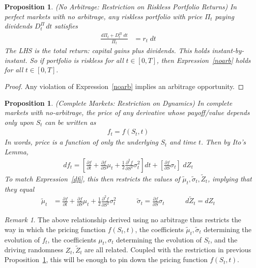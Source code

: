 \documentclass[12pt]{article}
\theoremstyle{plain}
\newtheorem{prop}[thm]{Proposition}
\theoremstyle{definition}
\theoremstyle{remark}
\newtheorem*{rmk}{Remark}
\begin{document}
\begin{prop}
\emph{(No Arbitrage: Restriction on Riskless Portfolio Returns)}
\label{prop:keypricing}
In perfect markets with no arbitrage, any riskless portfolio with price
$\Pi_t$ paying dividends $D_t^\Pi\,dt$ satisfies
\begin{align}
  \frac{d\Pi_t+ D_t^\Pi\;dt}{\Pi_t}
  &=
  r_t\;dt
  \label{noarb}
\end{align}
The LHS is the total return: capital gains plus dividends.
This holds instant-by-instant. So if portfolio is riskless for all
$t\in[0,T]$, then Expression~\ref{noarb} holds for all $t\in[0,T]$.
\end{prop}
\begin{proof}
Any violation of Expression~\ref{noarb} implies an arbitrage
opportunity.
\end{proof}

\begin{prop}
\label{prop:complete}
\emph{(Complete Markets: Restriction on Dynamics)}
In complete markets with no-arbitrage, the price of any derivative whose
payoff/value depends only upon $S_t$ can be written as
\begin{align}
  f_t=f(S_t,t)
  \label{pricingfcn}
\end{align}
In words, price is a function of only the underlying $S_t$ and time
$t$.  Then by Ito's Lemma,
\begin{align}
  df_t
  =
    \left[
      \frac{\partial f}{\partial t}
      +
      \frac{\partial f}{\partial S}
      \mu_t
      +
      \frac{1}{2}
      \frac{\partial^2 f}{\partial S^2}
      \sigma_t^2
    \right]
  dt
  +
    \left[
    \frac{\partial f}{\partial S}
    \sigma_t
    \right]
  \;dZ_t
  \label{evoderiv}
\end{align}
To match Expression~\ref{dfi}, this then restricts the values of
$\tilde{\mu}_t,\tilde{\sigma}_t,\tilde{Z}_t$, implying that they equal
\begin{align*}
  \tilde{\mu}_t
  &=
  \frac{\partial f}{\partial t}
  +
  \frac{\partial f}{\partial S}
  \mu_t
  +
  \frac{1}{2}
  \frac{\partial^2 f}{\partial S^2}
  \sigma_t^2
  \qquad
  \quad
  \tilde{\sigma}_t
  =
  \frac{\partial f}{\partial S}
  \sigma_t
  \qquad
  \quad
  d\tilde{Z}_t
  =
  dZ_t
\end{align*}
\end{prop}
\begin{rmk}
The above relationship derived using no arbitrage thus restricts the way
in which the pricing function $f(S_t,t)$, the coefficients
$\tilde{\mu}_t,\tilde{\sigma}_t$ determining the evolution of $f_t$,
the coefficients $\mu_t,\sigma_t$ determining the evolution of $S_t$,
and the driving randomness $Z_t,\tilde{Z}_t$ are all related.
Coupled with the restriction in previous
Proposition~\ref{prop:keypricing}, this will be enough to pin down the
pricing function $f(S_t,t)$.
\end{rmk}
\end{document}
